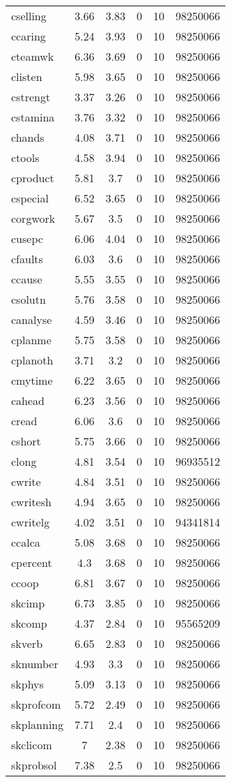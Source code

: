 \begin{center}
\begin{longtable}{l c c c c c}
cselling & 3.66 & 3.83 & 0 & 10 & 98250066\\
ccaring & 5.24 & 3.93 & 0 & 10 & 98250066\\
cteamwk & 6.36 & 3.69 & 0 & 10 & 98250066\\
clisten & 5.98 & 3.65 & 0 & 10 & 98250066\\
cstrengt & 3.37 & 3.26 & 0 & 10 & 98250066\\
cstamina & 3.76 & 3.32 & 0 & 10 & 98250066\\
chands & 4.08 & 3.71 & 0 & 10 & 98250066\\
ctools & 4.58 & 3.94 & 0 & 10 & 98250066\\
cproduct & 5.81 & 3.7 & 0 & 10 & 98250066\\
cspecial & 6.52 & 3.65 & 0 & 10 & 98250066\\
corgwork & 5.67 & 3.5 & 0 & 10 & 98250066\\
cusepc & 6.06 & 4.04 & 0 & 10 & 98250066\\
cfaults & 6.03 & 3.6 & 0 & 10 & 98250066\\
ccause & 5.55 & 3.55 & 0 & 10 & 98250066\\
csolutn & 5.76 & 3.58 & 0 & 10 & 98250066\\
canalyse & 4.59 & 3.46 & 0 & 10 & 98250066\\
cplanme & 5.75 & 3.58 & 0 & 10 & 98250066\\
cplanoth & 3.71 & 3.2 & 0 & 10 & 98250066\\
cmytime & 6.22 & 3.65 & 0 & 10 & 98250066\\
cahead & 6.23 & 3.56 & 0 & 10 & 98250066\\
cread & 6.06 & 3.6 & 0 & 10 & 98250066\\
cshort & 5.75 & 3.66 & 0 & 10 & 98250066\\
clong & 4.81 & 3.54 & 0 & 10 & 96935512\\
cwrite & 4.84 & 3.51 & 0 & 10 & 98250066\\
cwritesh & 4.94 & 3.65 & 0 & 10 & 98250066\\
cwritelg & 4.02 & 3.51 & 0 & 10 & 94341814\\
ccalca & 5.08 & 3.68 & 0 & 10 & 98250066\\
cpercent & 4.3 & 3.68 & 0 & 10 & 98250066\\
ccoop & 6.81 & 3.67 & 0 & 10 & 98250066\\
skcimp & 6.73 & 3.85 & 0 & 10 & 98250066\\
skcomp & 4.37 & 2.84 & 0 & 10 & 95565209\\
skverb & 6.65 & 2.83 & 0 & 10 & 98250066\\
sknumber & 4.93 & 3.3 & 0 & 10 & 98250066\\
skphys & 5.09 & 3.13 & 0 & 10 & 98250066\\
skprofcom & 5.72 & 2.49 & 0 & 10 & 98250066\\
skplanning & 7.71 & 2.4 & 0 & 10 & 98250066\\
skclicom & 7 & 2.38 & 0 & 10 & 98250066\\
skprobsol & 7.38 & 2.5 & 0 & 10 & 98250066\\
\hline\end{longtable}
\end{center}
